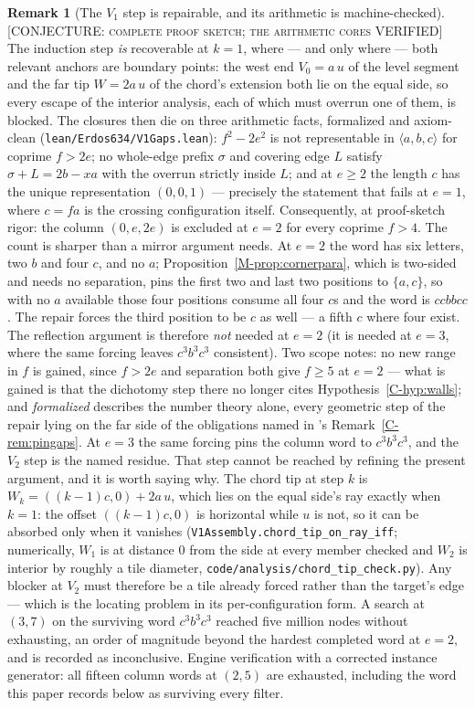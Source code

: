 \documentclass[11pt,reqno]{amsart}
\theoremstyle{plain}
\theoremstyle{definition}
\newtheorem{remark}[theorem]{Remark}
\newcommand{\lab}[1]{\hfill\textnormal{\footnotesize\textsc{[#1]}}}
\begin{document}
\begin{remark}[The $V_1$ step is repairable, and its arithmetic is machine-checked]\label{O-v1repair}\lab{CONJECTURE: complete proof sketch; the arithmetic cores VERIFIED}
The induction step \emph{is} recoverable at $k=1$, where --- and only where --- both relevant
anchors are boundary points: the west end $V_0=a\,u$ of the level segment and the far tip
$W=2a\,u$ of the chord's extension both lie on the equal side, so every escape of the interior
analysis, each of which must overrun one of them, is blocked. The closures then die on three
arithmetic facts, formalized and axiom-clean (\texttt{lean/Erdos634/V1Gaps.lean}): $f^2-2e^2$ is
not representable in $\langle a,b,c\rangle$ for coprime $f>2e$; no whole-edge prefix $\sigma$
and covering edge $L$ satisfy $\sigma+L=2b-xa$ with the overrun strictly inside $L$; and at
$e\ge2$ the length $c$ has the unique representation $(0,0,1)$ --- precisely the statement that
fails at $e=1$, where $c=fa$ is the crossing configuration itself. Consequently, at proof-sketch
rigor: the column $(0,e,2e)$ is excluded at $e=2$ for every coprime $f>4$. The count is sharper
than a mirror argument needs. At $e=2$ the word has six letters, two $b$ and four $c$, and no
$a$; Proposition~\ref{M-prop:cornerpara}, which is two-sided and needs no separation, pins the
first two and last two positions to $\{a,c\}$, so with no $a$ available those four positions
consume all four $c$s and the word is $ccbbcc$. The repair forces the third position to be $c$ as
well --- a fifth $c$ where four exist. The reflection argument is therefore \emph{not} needed at
$e=2$ (it is needed at $e=3$, where the same forcing leaves $c^3b^3c^3$ consistent). Two scope
notes: no new range in $f$ is gained, since $f>2e$ and separation both give $f\ge5$ at $e=2$ ---
what is gained is that the dichotomy step there no longer cites Hypothesis~\ref{C-hyp:walls};
and \emph{formalized} describes the number theory alone, every geometric step of the repair
lying on the far side of the obligations named in \cite{Companion}'s
Remark~\ref{C-rem:pingaps}. At $e=3$ the same forcing pins the column word to
$c^3b^3c^3$, and the $V_2$ step is the named residue. That step cannot be reached by refining the
present argument, and it is worth saying why. The chord tip at step $k$ is
$W_k=((k-1)c,0)+2a\,u$, which lies on the equal side's ray exactly when $k=1$: the offset
$((k-1)c,0)$ is horizontal while $u$ is not, so it can be absorbed only when it vanishes
(\texttt{V1Assembly.chord\_tip\_on\_ray\_iff}; numerically, $W_1$ is at distance $0$ from the
side at every member checked and $W_2$ is interior by roughly a tile diameter,
\texttt{code/analysis/chord\_tip\_check.py}). Any blocker at $V_2$ must therefore be a tile
already forced rather than the target's edge --- which is the locating problem in its
per-configuration form. A search at $(3,7)$ on the surviving word $c^3b^3c^3$ reached five million
nodes without exhausting, an order of magnitude beyond the hardest completed word at $e=2$, and is
recorded as inconclusive. Engine
verification with a corrected instance generator: all fifteen column words at $(2,5)$ are
exhausted, including the word this paper records below as surviving every filter.
\end{remark}
\end{document}
